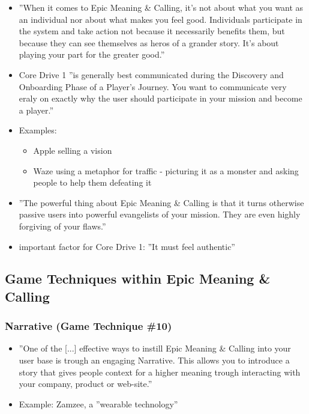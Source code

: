 \begin{itemize}
    \item ''When it comes to Epic Meaning \& Calling, it's not about what you want as an individual nor about what makes you feel good. Individuals participate in the system and take action not because it necessarily benefits them, but because they can see themselves as heros of a grander story. It's about playing your part for the greater good.''
    \item Core Drive 1 ''is generally best communicated during the Discovery and Onboarding Phase of a Player's Journey. You want to communicate very eraly on exactly why the user should participate in your mission and become a player.''
    \item Examples:
    \begin{itemize}
        \item Apple selling a vision
        \item Waze using a metaphor for traffic - picturing it as a monster and asking people to help them defeating it
    \end{itemize}
    \item ''The powerful thing about Epic Meaning \& Calling is that it turns otherwise passive users into powerful evangelists of your mission. They are even highly forgiving of your flaws.''
    \item important factor for Core Drive 1: ''It must feel authentic''
\end{itemize}

\subsection{Game Techniques within Epic Meaning \& Calling}
    \subsubsection{Narrative (Game Technique \#10)}
        \begin{itemize}
            \item ''One of the [...] effective ways to instill Epic Meaning \& Calling into your user base is trough an engaging Narrative. This allows you to introduce a story that gives people context for a higher meaning trough interacting with your company, product or web-site.''
            \item Example: Zamzee, a ''wearable technology''
        \end{itemize}
        
